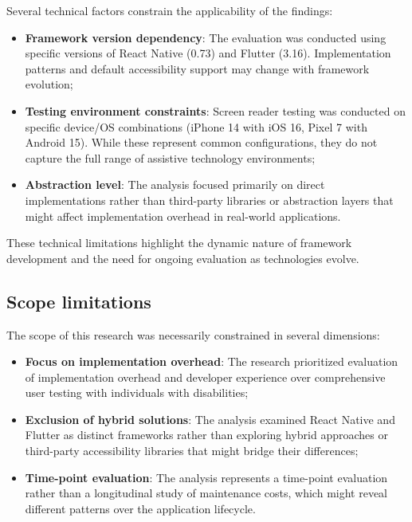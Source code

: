 Several technical factors constrain the applicability of the findings:

\begin{itemize}
    \item \textbf{Framework version dependency}: The evaluation was conducted using specific versions of React Native (0.73) and Flutter (3.16). Implementation patterns and default accessibility support may change with framework evolution;

    \item \textbf{Testing environment constraints}: Screen reader testing was conducted on specific device/OS combinations (iPhone 14 with iOS 16, Pixel 7 with Android 15). While these represent common configurations, they do not capture the full range of assistive technology environments;

    \item \textbf{Abstraction level}: The analysis focused primarily on direct implementations rather than third-party libraries or abstraction layers that might affect implementation overhead in real-world applications.
\end{itemize}

These technical limitations highlight the dynamic nature of framework development and the need for ongoing evaluation as technologies evolve.

\subsection{Scope limitations}
\label{subsec:limitations-scope}

The scope of this research was necessarily constrained in several dimensions:

\begin{itemize}
    \item \textbf{Focus on implementation overhead}: The research prioritized evaluation of implementation overhead and developer experience over comprehensive user testing with individuals with disabilities;

    \item \textbf{Exclusion of hybrid solutions}: The analysis examined React Native and Flutter as distinct frameworks rather than exploring hybrid approaches or third-party accessibility libraries that might bridge their differences;

    \item \textbf{Time-point evaluation}: The analysis represents a time-point evaluation rather than a longitudinal study of maintenance costs, which might reveal different patterns over the application lifecycle.
\end{itemize}

